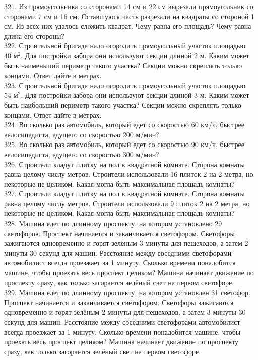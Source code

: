 321. Из прямоугольника со сторонами 14 см и 22 см вырезали прямоугольник со сторонами
7 см и 16 см. Оставшуюся часть разрезали на квадраты со стороной 1 см. Из всех них удалось сложить квадрат. Чему равна его площадь? Чему равна длина его стороны?\\
322. Строительной бригаде надо огородить прямоугольный участок площадью $40\text{ м}^2.$ Для постройки забора они используют секции длиной 2 м. Каким может быть
наименьший периметр такого участка? Секции можно скреплять только концами. Ответ дайте в метрах.\\
323. Строительной бригаде надо огородить прямоугольный участок площадью $54\text{ м}^2.$ Для постройки забора они используют секции длиной 3 м. Каким может быть
наибольший периметр такого участка? Секции можно скреплять только концами. Ответ дайте в метрах.\\
324. Во сколько раз автомобиль, который едет со скоростью 60 км/ч, быстрее велосипедиста, едущего со скоростью 200 м/мин?\\
325. Во сколько раз автомобиль, который едет со скоростью 90 км/ч, быстрее велосипедиста, едущего со скоростью 300 м/мин?\\
326. Строители кладут плитку на пол в квадратной комнате. Сторона комнаты равна целому числу метров. Строители использовали 16 плиток 2 на 2 метра,
но некоторые не целиком. Какая могла быть максимальная площадь комнаты?\\
327. Строители кладут плитку на пол в квадратной комнате. Сторона комнаты равна целому числу метров. Строители использовали 9 плиток 2 на 2 метра,
но некоторые не целиком. Какая могла быть максимальная площадь комнаты?\\
328. Машина едет по длинному проспекту, на котором установлено 29 светофоров. Проспект начинается и заканчивается светофором. Светофоры зажигаются одновременно и горят зелёным 3 минуты для пешеходов, а затем 2 минуты 30 секунд для машин. Расстояние между соседними
светофорами автомобилист всегда проезжает за 1 минуту. Сколько времени понадобится машине, чтобы проехать весь проспект целиком? Машина начинает движение по проспекту сразу, как только загорается зелёный свет на первом светофоре.\\
329. Машина едет по длинному проспекту, на котором установлен 31 светофор. Проспект начинается и заканчивается светофором. Светофоры зажигаются одновременно и горят зелёным 2 минуты для пешеходов, а затем 3 минуты 30 секунд для машин. Расстояние между соседними светофорами автомобилист всегда проезжает за 1 минуту. Сколько времени понадобится машине, чтобы проехать весь проспект целиком? Машина начинает движение по проспекту сразу, как только загорается зелёный свет на первом светофоре.\\
